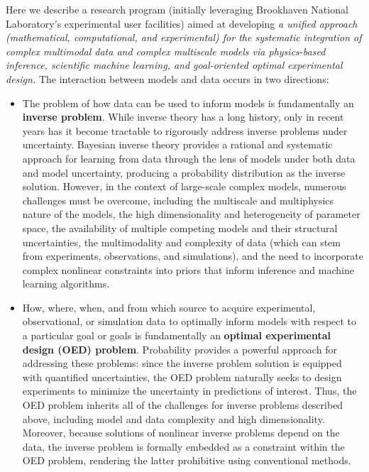 \documentclass[11pt]{article}
\newcommand{\zapspace}{\topsep=0pt\partopsep=0pt\itemsep=0pt\parskip=0pt}
\begin{document}
Here we describe a research program (initially leveraging Brookhaven National Laboratory's experimental user facilities)
aimed at developing {\em a
  unified approach (mathematical, computational, and experimental) for
  the systematic integration of complex multimodal data and complex
  multiscale models via physics-based inference, scientific machine learning,
  and goal-oriented optimal experimental design.}  The interaction
between models and data occurs in two directions:
 \vspace{-0.15cm}
 \begin{itemize}%
 \zapspace
 \item The problem of how data can be used to inform models is
   fundamentally an {\bf inverse problem}. While inverse theory has a
   long history, only in recent years has it become tractable to
   rigorously address inverse problems under uncertainty. Bayesian
   inverse theory provides a rational and systematic approach for
   learning from data through the lens of models under both data and
   model uncertainty, producing a probability distribution as the
   inverse solution.  However, in the context of large-scale complex
   models, numerous challenges must be overcome, including the
   multiscale and multiphysics nature of the models, the high
   dimensionality and heterogeneity of parameter space, the
   availability of multiple competing models and their structural
   uncertainties, the multimodality and complexity of data (which can
   stem from experiments, observations, and simulations), and the need
   to incorporate complex nonlinear constraints into priors that
   inform inference and machine learning algorithms.

\item How, where, when, and from which source to acquire experimental,
  observational, or simulation data to optimally inform models
  with respect to a particular goal or goals is fundamentally an {\bf
    optimal experimental design (OED) problem}. Probability provides a
  powerful approach for addressing these problems: since the inverse
  problem solution is equipped with quantified uncertainties, the OED
  problem naturally seeks to design experiments to minimize the
  uncertainty in predictions of interest.  Thus, the OED problem
  inherits all of the challenges for inverse problems described above,
  including model and data complexity and high
  dimensionality. Moreover, because solutions of nonlinear inverse
  problems depend on the data, the inverse problem is formally
  embedded as a constraint within the OED problem, rendering the
  latter prohibitive using conventional methods.

\end{itemize}
\end{document}
